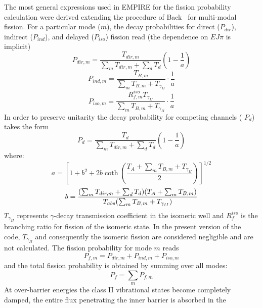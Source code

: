 The most general expressions used in EMPIRE for the fission probability
calculation were derived extending the procedure of Back~\cite{Back:74} for
multi-modal fission. For a particular mode ($m$), the decay probabilities
for direct ($P_{dir}$), indirect ($P_{ind}$), and delayed ($P_{iso}$)
fission read (the dependence on $EJ\pi$ is implicit) 
\begin{equation}
P_{dir,m}=\frac{T_{dir,m}}{\sum_{m}T_{dir,m}+\sum_{d}T_{d}}\left(1-\frac{1}{a%
}\right)
\end{equation}
\begin{equation}
P_{ind,m}=\frac{T_{B,m}}{\sum_{m}T_{B,m}+T_{\gamma_{II}}}\cdot\frac{1}{a}
\end{equation}
\begin{equation}
P_{iso,m}=\frac{R_{f,m}^{iso}T_{\gamma_{II}}}{\sum_{m}T_{B,m}+T_{\gamma_{II}}%
}\cdot\frac{1}{a}
\end{equation}
In order to preserve unitarity the decay probability for competing channels (%
$P_{d}$) takes the form 
\begin{equation}
P_{d}=\frac{T_{d}}{\sum_{m}T_{dir,m}+\sum_{d}T_{d}}\left(1-\frac{1}{a}\right)
\end{equation}
\noindent where: 
\begin{equation*}
a=\left[1+b^{2}+2b\coth\left(\frac{T_{A}+\sum_{m}T_{B,m}+T_{\gamma_{II}}}{2}%
\right)\right]^{1/2}
\end{equation*}
\begin{equation*}
b=\frac{(\sum_{m}T_{dir,m}+\sum_{d}T_{d})(T_{A}+\sum_{m}T_{B,m})}{%
T_{abs}(\sum_{m}T_{B,m}+T_{\gamma_{II}})}
\end{equation*}
$T_{\gamma_{II}}$ represents $\gamma$-decay transmission coefficient in the
isomeric well and $R_{f}^{iso}$ is the branching ratio for fission of the
isomeric state. In the present version of the code, $T_{\gamma_{II}}$ and
consequently the isomeric%
 fission are considered negligible and are not
calculated. The fission probability for mode $m$ reads 
\begin{equation}
P_{f,m}=P_{dir,m}+P_{ind,m}+P_{iso,m}
\end{equation}
and the total fission probability is obtained by summing over all modes: 
\begin{equation}
P_{f}=\sum_{m}P_{f,m}
\end{equation}
At over-barrier energies the class II vibrational states become completely
damped, the entire flux penetrating the inner barrier is absorbed in the
